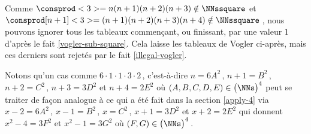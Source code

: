 \vspace{-1.5ex}
Comme $\consprod<3> = n(n+1)(n+2)(n+3) \notin \NNssquare$ et $\consprod[n+1]<3> = (n+1)(n+2)(n+3)(n+4) \notin \NNssquare$\,, nous pouvons ignorer tous les tableaux commençant, ou finissant, par une valeur $1$ d'après le fait \ref{vogler-sub-square}. Cela laisse les tableaux de Vogler ci-après, mais ces derniers sont rejetés par le fait \ref{illegal-vogler}.

\begin{center}
\end{center}


\begin{remark}
	Notons qu'un cas comme 
	$6 \cdot 1 \cdot 1 \cdot 3 \cdot 2$\,,
	c'est-à-dire
	$n = 6 A^2$\,, $n + 1 = B^2$\,, $n + 2 = C^2$\,, $n + 3 = 3 D^2$ et $n + 4 = 2 E^2$ 
	où $(A, B, C, D, E) \in \big( \NNs \big)^4$
	peut se traiter de façon analogue à ce qui a été fait dans la section \ref{apply-4} via
	$x - 2 = 6 A^2$\,, $x - 1 = B^2$\,, $x = C^2$\,, $x + 1 = 3 D^2$ et $x + 2 = 2 E^2$
	qui donnent
	$x^2 - 4 = 3 F^2$ et $x^2 - 1 = 3 G^2$
	où $(F, G) \in \big( \NNs \big)^4$\,.
\end{remark}
